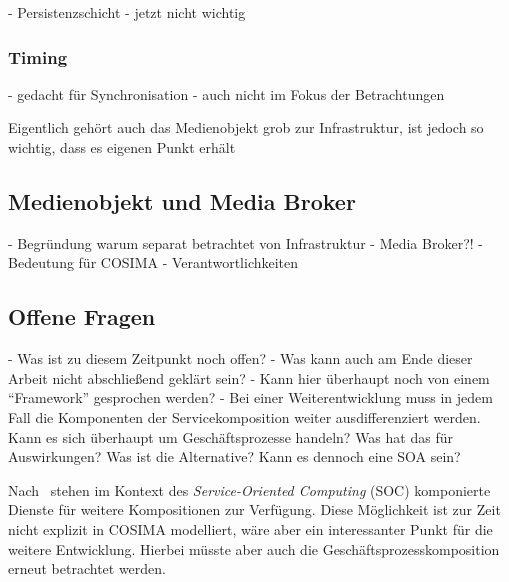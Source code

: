   - Persistenzschicht
  - jetzt nicht wichtig


\subsubsection{Timing} %
\label{ssub:timing}

  - gedacht für Synchronisation
  - auch nicht im Fokus der Betrachtungen


  Eigentlich gehört auch das Medienobjekt grob zur Infrastruktur, ist jedoch so wichtig, dass es eigenen Punkt erhält


\subsection{Medienobjekt und Media Broker} %
\label{sub:medienobjekt}

  - Begründung warum separat betrachtet von Infrastruktur
  - Media Broker?!
  - Bedeutung für COSIMA
  - Verantwortlichkeiten


\subsection{Offene Fragen} %
\label{sub:offene_fragen}

  - Was ist zu diesem Zeitpunkt noch offen?
  - Was kann auch am Ende dieser Arbeit nicht abschließend geklärt sein?
  - Kann hier überhaupt noch von einem "`Framework"' gesprochen werden?
  - Bei einer Weiterentwicklung muss in jedem Fall die Komponenten der Servicekomposition weiter ausdifferenziert werden. Kann es sich überhaupt um Geschäftsprozesse handeln? Was hat das für Auswirkungen? Was ist die Alternative? Kann es dennoch eine SOA sein?
  
  Nach~\citep{service_oriented_computing} stehen im Kontext des \emph{Service-Oriented Computing} (SOC) komponierte Dienste für weitere Kompositionen zur Verfügung. Diese Möglichkeit ist zur Zeit nicht explizit in COSIMA modelliert, wäre aber ein interessanter Punkt für die weitere Entwicklung. Hierbei müsste aber auch die Geschäftsprozesskomposition erneut betrachtet werden.
  



